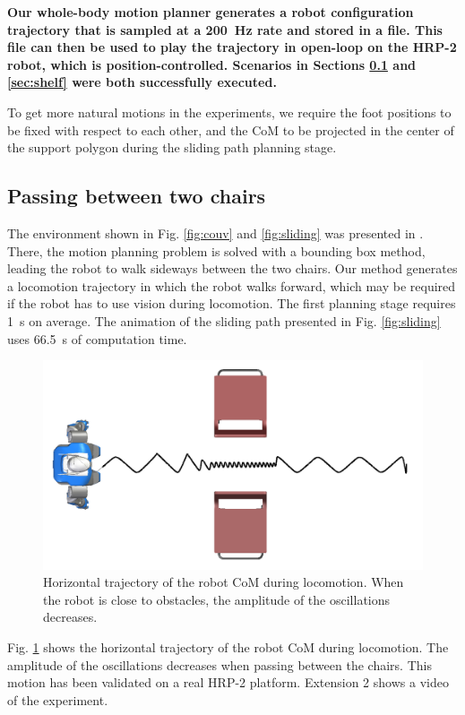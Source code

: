 \documentclass{article}
\begin{document}
\textbf{Our whole-body motion planner generates a robot configuration
  trajectory that is sampled at a 200~Hz rate and stored in a
  file. This file can then be used to play the trajectory in open-loop
  on the HRP-2 robot, which is position-controlled. Scenarios in
  Sections \ref{sec:chairs} and \ref{sec:shelf} were both successfully
  executed.}

To get more natural motions in the experiments, we require the foot
positions to be fixed with respect to each other, and the CoM to be
projected in the center of the support polygon during the sliding path
planning stage.

\subsection{Passing between two chairs}
\label{sec:chairs}

The environment shown in Fig. \ref{fig:couv} and \ref{fig:sliding} was presented
in \cite{el2011path}. There, the motion planning problem is solved with a bounding
box method, leading the robot to walk sideways between the two chairs.
Our method generates a locomotion  trajectory in which the robot walks
forward, which may be required if the robot has to use vision during
locomotion. The first planning stage  requires 1~s
on  average.   The  animation  of   the  sliding  path   presented  in
Fig.   \ref{fig:sliding}   uses  66.5~s  of  computation   time.


\begin{figure}[h!]
\centering
\includegraphics[width=0.7\linewidth]{pics/chairs/waist-trajectory.png}

\caption{Horizontal trajectory of the robot CoM during
  locomotion. When the robot is close to obstacles, the amplitude of
  the oscillations decreases.}
\label{fig:chairs-waist}
\end{figure}



Fig.  \ref{fig:chairs-waist} shows  the horizontal  trajectory  of the
robot CoM  during  locomotion. The amplitude of the oscillations  decreases when passing
between the  chairs.  This motion has  been validated on  a real HRP-2
platform. Extension 2 shows a video of the experiment.
\end{document}
